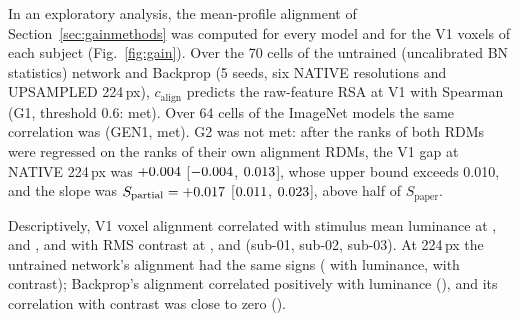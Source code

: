 In an exploratory analysis, the mean-profile alignment of Section~\ref{sec:gainmethods} was computed for every model
and for the V1 voxels of each subject (Fig.~\ref{fig:gain}). Over the 70 cells of the
untrained (uncalibrated BN statistics) network and Backprop (5 seeds, six NATIVE
resolutions and UPSAMPLED 224\,px), $c_{\mathrm{align}}$ predicts the raw-feature RSA at
V1 with Spearman \GOneSpearman{} (G1, threshold 0.6: met). Over 64 cells of the ImageNet
models the same correlation was \GenOneSpearman{} (GEN1, met). G2 was not met: after the
ranks of both RDMs were regressed on the ranks of their own alignment RDMs, the V1 gap at
NATIVE 224\,px was $+0.004$ [$-0.004$, $0.013$], whose
upper bound exceeds 0.010, and the slope was $S_{\mathrm{partial}} = +0.017$
[$0.011$, $0.023$], above half of $S_{\mathrm{paper}}$.

Descriptively, V1 voxel alignment correlated with stimulus mean luminance at
\VoxGainLumSubOne, \VoxGainLumSubTwo{} and \VoxGainLumSubThree, and with RMS contrast at
\VoxGainConSubOne, \VoxGainConSubTwo{} and \VoxGainConSubThree{} (sub-01, sub-02,
sub-03). At 224\,px the untrained network's alignment had the same signs
(\ModelGainRandLum{} with luminance, \ModelGainRandCon{} with contrast); Backprop's alignment correlated positively with luminance (\ModelGainBpLum), and its correlation with contrast
was close to zero (\ModelGainBpCon).
